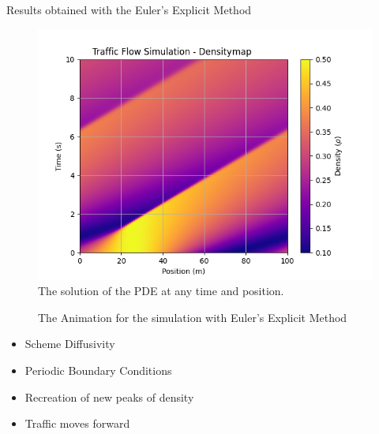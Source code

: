 \documentclass{beamer}
\begin{document}
\begin{frame}{Results obtained with the Euler's Explicit Method}
	\vspace{-0.5cm}
	\begin{minipage}[t]{0.48\linewidth}
		\begin{figure}
			\centering
			\includegraphics[width=\linewidth]{traffic_flow_density_map.png}
			\caption[Traffic Flow Simulation With Euler's Explicit]{ The solution of the PDE at any time and position.}
			\label{fig:traffic_flow_density_map}
		\end{figure}
	\end{minipage}
	\hfill
	\begin{minipage}[t]{0.48\linewidth}
		\begin{figure}
			\centering
			\caption{The Animation for the simulation with Euler's Explicit Method}
			\label{fig:euler_explicit_animation}
		\end{figure}
	\end{minipage}
	\vspace{-0.2cm}
	\begin{block}{}
		\begin{multicols}{2}
			\begin{itemize}
				\item Scheme Diffusivity
				\item Periodic Boundary Conditions 
				\item Recreation of new peaks of density
				\item Traffic moves forward
			\end{itemize}
		\end{multicols}
	\end{block}
\end{frame}
\end{document}
